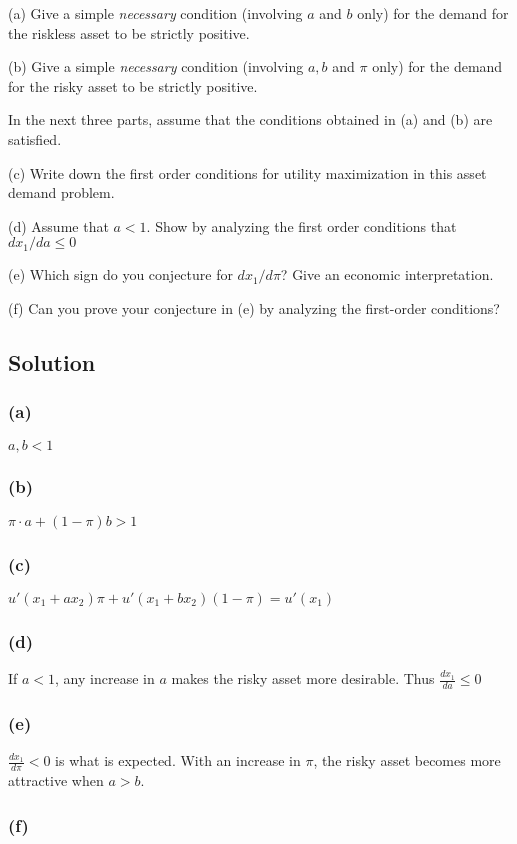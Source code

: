 \documentclass[10pt, a4paper]{article}
\begin{document}
      (a) Give a simple \textit{necessary} condition (involving $a$ and $b$ only) for the demand for the riskless asset to be strictly positive.

      (b) Give a simple \textit{necessary} condition (involving $a,b$ and $\pi$ only) for the demand for the risky asset to be strictly positive.
     
      In the next three parts, assume that the conditions obtained in (a) and (b) are satisfied.

      (c) Write down the first order conditions for utility maximization in this asset demand problem.

      (d) Assume that $a<1$. Show by analyzing the first order conditions that $dx_1/da\leq0$

      (e) Which sign do you conjecture for $dx_1/d\pi$? Give an economic interpretation.

      (f) Can you prove your conjecture in (e) by analyzing the first-order conditions?
    \subsection*{Solution}
      \subsubsection*{(a)}
        $a,b < 1$
      \subsubsection*{(b)}
        $\pi\cdot a + (1-\pi)b > 1$
      \subsubsection*{(c)}
        $u'(x_1+ax_2)\pi + u'(x_1 + bx_2)(1-\pi) = u'(x_1)$
      \subsubsection*{(d)}
        If $a<1$, any increase in $a$ makes the risky asset more desirable. Thus $\frac{dx_1}{da}\leq 0$
      \subsubsection*{(e)}
        $\frac{dx_1}{d\pi}<0$ is what is expected. With an increase in $\pi$, the risky asset becomes more attractive when $a>b$.
      \subsubsection{(f)}
        
\end{document}
